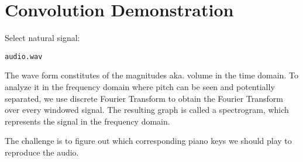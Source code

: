 \chapter{Convolution Demonstration}
Select natural signal: \begin{verbatim}audio.wav\end{verbatim}


The wave form constitutes of the magnitudes aka. volume in the time domain. To analyze it in the frequency domain where pitch can be seen and potentially separated, we use discrete Fourier Transform to obtain the Fourier Transform over every windowed signal. The resulting graph is called a spectrogram, which represents the signal in the frequency domain.


The challenge is to figure out which corresponding piano keys we should play to reproduce the audio.
